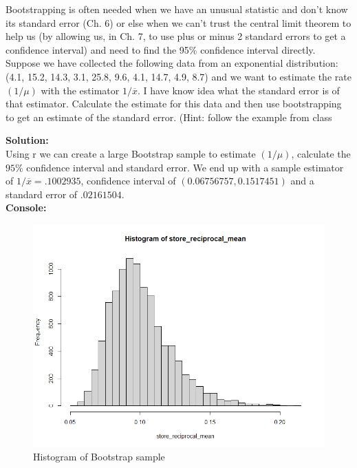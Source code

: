 \documentclass[12pt]{article}
\makeatletter
\theoremstyle{homework}
\newenvironment{exercise}[1]
{\def\@currentlabel{#1}\exercisecore}
{\endexercisecore}
\newcommand{\localhead}[1]{\par\smallskip\noindent\textbf{#1}\nobreak\\}%
\newcommand\solution{\localhead{Solution:}}
\makeatother
\begin{document}
\begin{exercise}{Bootstrap} Bootstrapping is often needed when we have an unusual statistic and don't know its
   standard error (Ch. 6) or else when we can't trust the central limit theorem to help us 
  (by allowing us, in Ch. 7, to use plus or minus 2 standard errors to get a confidence interval)
  and need to find the 95\% confidence interval directly.  
    Suppose we have collected the following data from an exponential distribution:  
    (4.1, 15.2, 14.3, 3.1, 25.8, 9.6, 4.1, 14.7, 4.9, 8.7)
    and we want to estimate the rate $(1/\mu)$ with the estimator $1/\overline{x}$.  
    I have know idea what the standard error is of that estimator.  
    Calculate the estimate for this data and then use bootstrapping to get an estimate of the standard error.
    (Hint:  follow the example from class\\

    \solution 
    Using r we can create a large Bootstrap sample to estimate $(1/\mu)$, calculate the $95\%$ confidence interval
    and standard error. We end up with a sample estimator of  $1/\overline{x} = .1002935$, confidence interval of 
    $(0.06756757, 0.1517451)$ and a standard error of $.02161504$.\\

    \textbf{Console:}
    \begin{center}
    
    \end{center}
    \begin{figure}[H]
      \caption{Histogram of Bootstrap sample}
      \includegraphics[width = \textwidth]{bootstrap.png}  
      \centering
    \end{figure}

\end{exercise}
\vspace{.5in}
\end{document}
